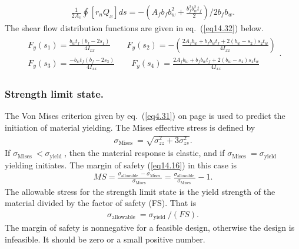 \documentclass{AeroStructure-ERJohnson}
\begin{document}
\vspace*{-2pc}

\begin{align}\label{eq14.31}
\frac{1}{2 A_{c}} \oint\left[r_{n} Q_{x}\right] d s=-\left(A_f b_{f} b_{w}^{2}+\frac{b_{f}^{2} b_{w}^{2} t_{f}}{2}\right)/2 b_{f} b_{w}.
\end{align}
The shear flow distribution functions are given in eq.~(\ref{eq14.32}) below.
\begin{align}\label{eq14.32}
\begin{split}
F_{y}\left(s_{1}\right)=\frac{b_{w} t_{f}\left(b_{f}-2 s_{1}\right)}{4 I_{x x}} \qquad F_{y}\left(s_{2}\right)=-\left(\frac{2 A_{f} b_{w}+b_{f} b_{w} t_{f}+2\left(b_{w}-s_{2}\right) s_{2} t_{w}}{4 I_{x x}}\right) \\F_{y}\left(s_{3}\right)=\frac{-b_{w} t_{f}\left(b_{f}-2 s_{3}\right)}{4 I_{x x}} \qquad F_{y}\left(s_{4}\right)=\frac{2 A_{f} b_{w}+b_{f} b_{w} t_{f}+2\left(b_{w}-s_{4}\right) s_{4} t_{w}}{4 I_{x x}}
\end{split}.
\end{align}

\subsubsection{Strength limit state.} The Von Mises criterion given by eq.~(\ref{eq4.31}) on page \pageref{eq4.31} is used to predict the initiation of material yielding. The Mises effective stress is defined by
\begin{align}\label{eq14.33}
\sigma_{\text{Mises }}=\sqrt{\sigma_{z z}^{2}+3 \sigma_{z s}^{2}}.
\end{align}
If $\sigma_{\text{Mises }}<\sigma_{\text{yield }}$, then the material response is elastic, and if $\sigma_{\text{Mises }}=\sigma_{\text{yield }}$ yielding initiates. The margin of safety (\ref{eq14.16}) in this case is
\begin{align}\label{eq14.34}
\textit{MS}=\frac{\sigma_{\text{allowable }}-\sigma_{\text{Mises }}}{\sigma_{\text{Mises }}}=\frac{\sigma_{\text{allowable }}}{\sigma_{\text{Mises }}}-1.
\end{align}
The allowable stress for the strength limit state is the yield strength of the material divided by the factor of safety (FS). That is
\begin{align}\label{eq14.35}
\sigma_{\text{allowable }}=\sigma_{\text{yield }} /(F S).
\end{align}
The margin of safety is nonnegative for a feasible design, otherwise the design is infeasible. It should be zero or a small positive number.
\end{document}

